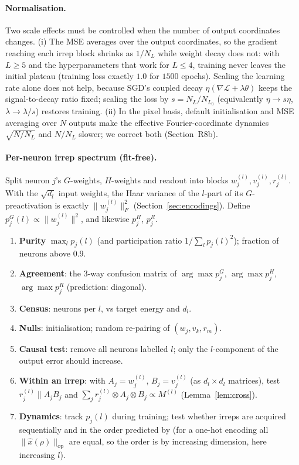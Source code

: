 \documentclass[a4paper,11pt]{article}
\theoremstyle{remark}
\theoremstyle{definition}
\begin{document}
\paragraph{Normalisation.} Two scale effects must be controlled when the number
of output coordinates changes. (i) The MSE averages over the output coordinates, so
the gradient reaching each irrep block shrinks as $1/N_L$ while weight decay does
not: with $L\ge5$ and the hyperparameters that work for $L\le4$, training never
leaves the initial plateau (training loss exactly $1.0$ for $1500$ epochs). Scaling
the learning rate alone does not help, because SGD's coupled decay
$\eta(\nabla\mathcal L+\lambda\theta)$ keeps the signal-to-decay ratio fixed; scaling
the loss by $s=N_L/N_{L_0}$ (equivalently $\eta\to s\eta$, $\lambda\to\lambda/s$)
restores training. (ii) In the pixel basis, default initialisation and MSE
averaging over $N$ outputs make the effective Fourier-coordinate dynamics
$\sqrt{N/N_L}$ and $N/N_L$ slower; we correct both (Section~R8b).

\paragraph{Per-neuron irrep spectrum (fit-free).} Split neuron $j$'s
$G$-weights, $H$-weights and readout into blocks $w_j^{(l)},v_j^{(l)},r_j^{(l)}$.
With the $\sqrt{d_l}$ input weights, the Haar variance of the $l$-part of its
$G$-preactivation is exactly $\|w_j^{(l)}\|_F^2$ (Section~\ref{sec:encodings}).
Define $p^G_j(l)\propto\|w_j^{(l)}\|^2$, and likewise $p^H_j$, $p^R_j$.
\begin{enumerate}
\item \textbf{Purity} $\max_lp_j(l)$ (and participation ratio $1/\sum_lp_j(l)^2$);
  fraction of neurons above $0.9$.
\item \textbf{Agreement}: the $3$-way confusion matrix of
  $\arg\max p^G_j$, $\arg\max p^H_j$, $\arg\max p^R_j$ (prediction: diagonal).
\item \textbf{Census}: neurons per $l$, vs target energy and $d_l$.
\item \textbf{Nulls}: initialisation; random re-pairing of $(w_j,v_k,r_m)$.
\item \textbf{Causal test}: remove all neurons labelled $l$; only the
  $l$-component of the output error should increase.
\item \textbf{Within an irrep}: with $A_j=w_j^{(l)}$, $B_j=v_j^{(l)}$ (as
  $d_l\times d_l$ matrices), test $r_j^{(l)}\parallel A_jB_j$ and
  $\sum_jr_j^{(l)}\otimes A_j\otimes B_j\propto M^{(l)}$ (Lemma~\ref{lem:cross}).
\item \textbf{Dynamics}: track $p_j(l)$ during training; test whether irreps
  are acquired sequentially and in the order predicted by
  \cite{marchetti2026sequential} (for a one-hot encoding all
  $\|\hat x(\rho)\|_{\mathrm{op}}$ are equal, so the order is by increasing
  dimension, here increasing $l$).
\end{enumerate}
\end{document}
